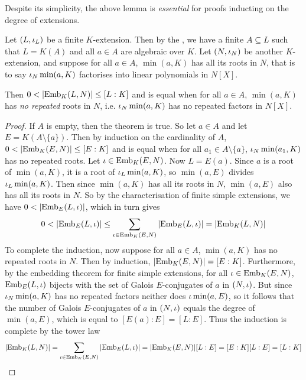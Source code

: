 \documentclass[main.tex]{subfiles}
\begin{document}
\begin{rmk}
  Despite its simplicity, the above lemma
  is \emph{essential} for proofs inducting on the degree of extensions.
\end{rmk}

\begin{thm}  
  
  Let $(L,\iota_L)$ be a finite $K$-extension.
  Then by the , 
  we have a finite $A \subseteq L$ such that 
  $L = K(A)$ and all $a \in A$ are algebraic over $K$. 
  Let $(N,\iota_N)$ be another $K$-extension, 
  and suppose for all $a \in A$, 
  $\min(a,K)$ has all its roots in $N$, 
  that is to say $\iota_N \min(a,K)$ factorises 
  into linear polynomials in $N[X]$. 

  Then $0 < |\mathrm{Emb}_{K}(L, N)| \leq [L : K]$
  and is equal when for all $a \in A$, 
  $\min(a,K)$ has \emph{no repeated} roots in $N$,
  i.e. $\iota_N \min(a,K)$ has no repeated factors in $N[X]$.  

\end{thm} 
\begin{proof}
  If $A$ is empty, then the theorem is true.
  So let $a \in A$ and let $E = K(A \setminus \{a\})$. 
  Then by induction on the cardinality of $A$, 
  $0 < |\mathrm{Emb}_{K}(E, N)| \leq [E : K]$
  and is equal when for all $a_1 \in A \setminus \{a\}$, 
  $\iota_N \min(a_1,K)$ has no repeated roots. 
  Let $\iota \in \mathrm{Emb}_{K}(E, N)$. 
  Now $L = E(a)$.
  Since $a$ is a root of $\min(a,K)$,
  it is a root of $\iota_L \min(a,K)$,
  so $\min(a,E)$ divides $\iota_L \min(a,K)$. 
  Then since $\min(a,K)$ has all its roots in $N$,
  $\min(a,E)$ also has all its roots in $N$. 
  So by the 
  {characterisation of finite simple extensions}, 
  we have $0 < |\mathrm{Emb}_{E}(L, \iota)|$,
  which in turn gives \[
    0 < |\mathrm{Emb}_{E}(L, \iota)| 
    \leq \sum_{\iota \in \mathrm{Emb}_{K}(E, N)} |\mathrm{Emb}_{E}(L, \iota)| = |\mathrm{Emb}_{K}(L, N)|
  \]
  To complete the induction, 
  now suppose for all $a \in A$, $\min(a,K)$ has no repeated roots in $N$. 
  Then by induction, $|\mathrm{Emb}_{K}(E, N)| = [E : K]$. 
  Furthermore, by the 
  {embedding theorem for finite simple extensions}, 
  for all $\iota \in \mathrm{Emb}_{K}(E, N)$, 
  $\mathrm{Emb}_{E}(L, \iota)$ bijects with 
  the set of Galois $E$-conjugates of $a$ in $(N,\iota)$.
  But since $\iota_N \min(a, K)$ has no repeated factors 
  neither does $\iota \min(a,E)$, 
  so it follows that the number of Galois $E$-conjugates of $a$ in $(N,\iota)$
  equals the degree of $\min(a,E)$, which is equal to $[E(a) : E] = [L : E]$. 
  Thus the induction is complete by the tower law \[
    |\mathrm{Emb}_{K}(L, N)| = \sum_{\iota \in \mathrm{Emb}_{K}(E, N)} |\mathrm{Emb}_{E}(L, \iota)|
    = |\mathrm{Emb}_{K}(E, N)| [L : E] = [E : K] [L : E] = [L : K]
  \]
\end{proof}
\end{document}
